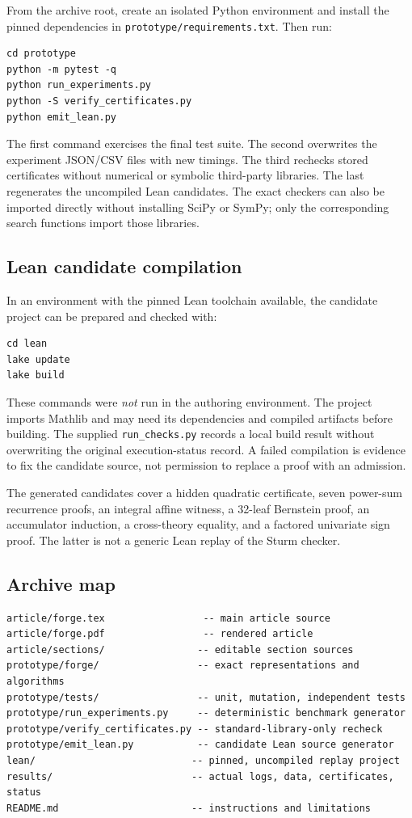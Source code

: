 \documentclass[11pt,a4paper]{article}
\theoremstyle{definition}
\newcommand{\code}[1]{\texttt{#1}}
\begin{document}
From the archive root, create an isolated Python environment and install the pinned dependencies in \code{prototype/requirements.txt}. Then run:

\begin{lstlisting}
cd prototype
python -m pytest -q
python run_experiments.py
python -S verify_certificates.py
python emit_lean.py
\end{lstlisting}

The first command exercises the final test suite. The second overwrites the experiment JSON/CSV files with new timings. The third rechecks stored certificates without numerical or symbolic third-party libraries. The last regenerates the uncompiled Lean candidates. The exact checkers can also be imported directly without installing SciPy or SymPy; only the corresponding search functions import those libraries.

\subsection{Lean candidate compilation}

In an environment with the pinned Lean toolchain available, the candidate project can be prepared and checked with:

\begin{lstlisting}
cd lean
lake update
lake build
\end{lstlisting}

These commands were \emph{not} run in the authoring environment. The project imports Mathlib and may need its dependencies and compiled artifacts before building. The supplied \code{run\_checks.py} records a local build result without overwriting the original execution-status record. A failed compilation is evidence to fix the candidate source, not permission to replace a proof with an admission.

The generated candidates cover a hidden quadratic certificate, seven power-sum recurrence proofs, an integral affine witness, a 32-leaf Bernstein proof, an accumulator induction, a cross-theory equality, and a factored univariate sign proof. The latter is not a generic Lean replay of the Sturm checker.

\subsection{Archive map}

\begin{lstlisting}
article/forge.tex                 -- main article source
article/forge.pdf                 -- rendered article
article/sections/                -- editable section sources
prototype/forge/                 -- exact representations and algorithms
prototype/tests/                 -- unit, mutation, independent tests
prototype/run_experiments.py     -- deterministic benchmark generator
prototype/verify_certificates.py -- standard-library-only recheck
prototype/emit_lean.py           -- candidate Lean source generator
lean/                           -- pinned, uncompiled replay project
results/                        -- actual logs, data, certificates, status
README.md                       -- instructions and limitations
\end{lstlisting}
\end{document}
